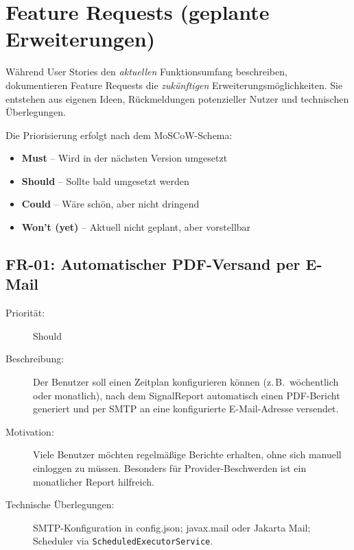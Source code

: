 \section{Feature Requests (geplante Erweiterungen)}
\label{sec:featurerequests}

Während User Stories den \textit{aktuellen} Funktionsumfang beschreiben, dokumentieren
Feature Requests die \textit{zukünftigen} Erweiterungsmöglichkeiten. Sie entstehen aus
eigenen Ideen, Rückmeldungen potenzieller Nutzer und technischen Überlegungen.

Die Priorisierung erfolgt nach dem MoSCoW-Schema:
\begin{itemize}
  \item \textbf{Must} -- Wird in der nächsten Version umgesetzt
  \item \textbf{Should} -- Sollte bald umgesetzt werden
  \item \textbf{Could} -- Wäre schön, aber nicht dringend
  \item \textbf{Won't (yet)} -- Aktuell nicht geplant, aber vorstellbar
\end{itemize}

\subsection{FR-01: Automatischer PDF-Versand per E-Mail}
\begin{description}
  \item[Priorität:] Should
  \item[Beschreibung:] Der Benutzer soll einen Zeitplan konfigurieren können (z.\,B.\
    wöchentlich oder monatlich), nach dem SignalReport automatisch einen PDF-Bericht
    generiert und per SMTP an eine konfigurierte E-Mail-Adresse versendet.
  \item[Motivation:] Viele Benutzer möchten regelmäßige Berichte erhalten, ohne sich
    manuell einloggen zu müssen. Besonders für Provider-Beschwerden ist ein monatlicher
    Report hilfreich.
  \item[Technische Überlegungen:] SMTP-Konfiguration in config.json; javax.mail oder
    Jakarta Mail; Scheduler via \texttt{Scheduled\-Executor\-Service}.
\end{description}

